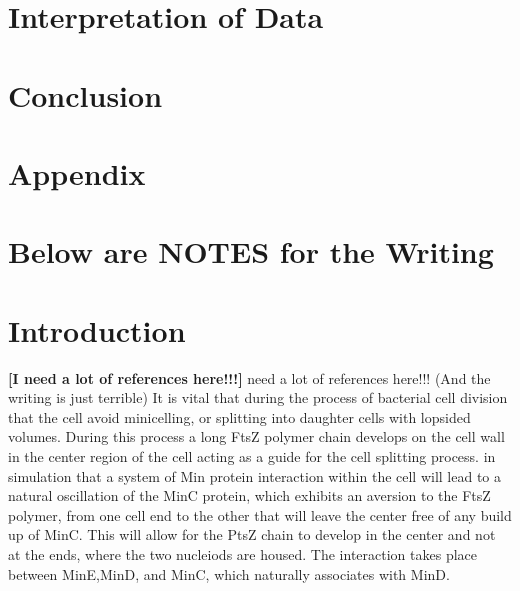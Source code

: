 \documentclass[letterpaper,twocolumn,amsmath,amssymb,pre]{revtex4-1}
\newcommand{\red}[1]{{\bf \color{red} #1}}
\newcommand{\fixme}[1]{\red{[#1]}}
\begin{document}
\section{Interpretation of Data}
\section{Conclusion}
\section*{Appendix}












\section{Below are NOTES for the Writing}













\section{Introduction}
\fixme{I need a lot of references here!!!}
 need a lot of references here!!!  (And the writing is just
terrible) It is vital that during the process of bacterial cell
division that the cell avoid minicelling, or splitting into daughter
cells with lopsided volumes.  During this process a long FtsZ polymer
chain develops on the cell wall in the center region of the cell
acting as a guide for the cell splitting process.  in simulation that a system of Min protein interaction within
the cell will lead to a natural oscillation of the MinC protein, which
exhibits an aversion to the FtsZ polymer, from one cell end to the
other that will leave the center free of any build up of MinC.  This
will allow for the PtsZ chain to develop in the center and not at the
ends, where the two nucleiods are housed.  The interaction takes place
between MinE,MinD, and MinC, which naturally associates with MinD.
\end{document}
